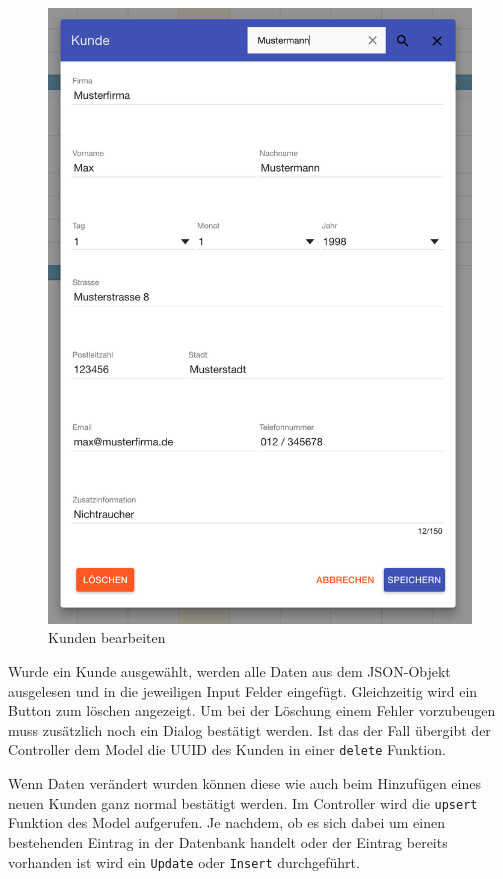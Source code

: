 \begin{figure}[H]
\begin{minipage}[t]{0.49\linewidth}
        \includegraphics[width=\linewidth]{images/frontend_customer_edit.png}
        \caption{Kunden bearbeiten}
        \label{frontend_customer_edit}
    \end{minipage}
\end{figure}

Wurde ein Kunde ausgewählt, werden alle Daten aus dem JSON-Objekt ausgelesen und in die jeweiligen Input Felder eingefügt.
Gleichzeitig wird ein Button zum löschen angezeigt. Um bei der Löschung einem Fehler vorzubeugen muss zusätzlich noch ein Dialog bestätigt werden.
Ist das der Fall übergibt der Controller dem Model die UUID des Kunden in einer \texttt{delete} Funktion.

Wenn Daten verändert wurden können diese wie auch beim Hinzufügen eines neuen Kunden ganz normal bestätigt werden.
Im Controller wird die \texttt{upsert} Funktion des Model aufgerufen. Je nachdem, ob es sich dabei um einen bestehenden
Eintrag in der Datenbank handelt oder der Eintrag bereits vorhanden ist wird ein \texttt{Update} oder \texttt{Insert} durchgeführt.

